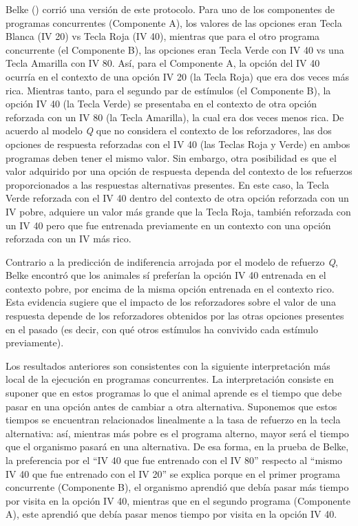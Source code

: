 \documentclass[
  a4paper,
  DIV=11,
  numbers=noendperiod]{scrreprt}
\begin{document}
Belke () corrió una versión de este protocolo. Para uno de los
componentes de programas concurrentes (Componente A), los valores de las
opciones eran Tecla Blanca (IV 20) vs Tecla Roja (IV 40), mientras que
para el otro programa concurrente (el Componente B), las opciones eran
Tecla Verde con IV 40 vs una Tecla Amarilla con IV 80. Así, para el
Componente A, la opción del IV 40 ocurría en el contexto de una opción
IV 20 (la Tecla Roja) que era dos veces más rica. Mientras tanto, para
el segundo par de estímulos (el Componente B), la opción IV 40 (la Tecla
Verde) se presentaba en el contexto de otra opción reforzada con un IV
80 (la Tecla Amarilla), la cual era dos veces menos rica. De acuerdo al
modelo \emph{Q} que no considera el contexto de los reforzadores, las
dos opciones de respuesta reforzadas con el IV 40 (las Teclas Roja y
Verde) en ambos programas deben tener el mismo valor. Sin embargo, otra
posibilidad es que el valor adquirido por una opción de respuesta
dependa del contexto de los refuerzos proporcionados a las respuestas
alternativas presentes. En este caso, la Tecla Verde reforzada con el IV
40 dentro del contexto de otra opción reforzada con un IV pobre,
adquiere un valor más grande que la Tecla Roja, también reforzada con un
IV 40 pero que fue entrenada previamente en un contexto con una opción
reforzada con un IV más rico.

Contrario a la predicción de indiferencia arrojada por el modelo de
refuerzo \emph{Q}, Belke encontró que los animales sí preferían la
opción IV 40 entrenada en el contexto pobre, por encima de la misma
opción entrenada en el contexto rico. Esta evidencia sugiere que el
impacto de los reforzadores sobre el valor de una respuesta depende de
los reforzadores obtenidos por las otras opciones presentes en el pasado
(es decir, con qué otros estímulos ha convivido cada estímulo
previamente).

Los resultados anteriores son consistentes con la siguiente
interpretación más local de la ejecución en programas concurrentes. La
interpretación consiste en suponer que en estos programas lo que el
animal aprende es el tiempo que debe pasar en una opción antes de
cambiar a otra alternativa. Suponemos que estos tiempos se encuentran
relacionados linealmente a la tasa de refuerzo en la tecla alternativa:
así, mientras más pobre es el programa alterno, mayor será el tiempo que
el organismo pasará en una alternativa. De esa forma, en la prueba de
Belke, la preferencia por el ``IV 40 que fue entrenado con el IV 80''
respecto al ``mismo IV 40 que fue entrenado con el IV 20'' se explica
porque en el primer programa concurrente (Componente B), el organismo
aprendió que debía pasar más tiempo por visita en la opción IV 40,
mientras que en el segundo programa (Componente A), este aprendió que
debía pasar menos tiempo por visita en la opción IV 40.
\end{document}

